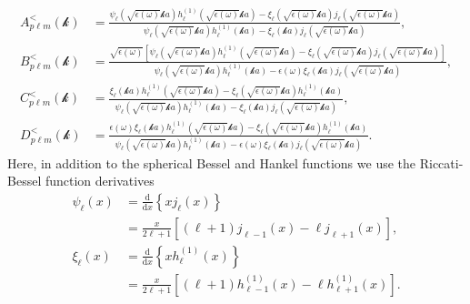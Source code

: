 \documentclass{article}
\begin{document}
\begin{equation}
\begin{split}
A_{p\ell m}^<(\mathcal{k}) &= \frac{\psi_\ell\left(\sqrt{\epsilon(\omega)}\mathcal{k}a\right)h_\ell^{(1)}\left(\sqrt{\epsilon(\omega)}\mathcal{k}a\right) - \xi_\ell\left(\sqrt{\epsilon(\omega)}\mathcal{k}a\right)j_\ell\left(\sqrt{\epsilon(\omega)}\mathcal{k}a\right)}{\psi_\ell\left(\sqrt{\epsilon(\omega)}\mathcal{k}a\right)h_\ell^{(1)}(\mathcal{k}a) - \xi_\ell(\mathcal{k}a)j_\ell\left(\sqrt{\epsilon(\omega)}\mathcal{k}a\right)},\\[1.0em]
B_{p\ell m}^<(\mathcal{k}) &= \frac{\sqrt{\epsilon(\omega)}\left[\psi_\ell\left(\sqrt{\epsilon(\omega)}\mathcal{k}a\right)h_\ell^{(1)}\left(\sqrt{\epsilon(\omega)}\mathcal{k}a\right) - \xi_\ell\left(\sqrt{\epsilon(\omega)}\mathcal{k}a\right)j_\ell\left(\sqrt{\epsilon(\omega)}\mathcal{k}a\right)\right]}{\psi_\ell\left(\sqrt{\epsilon(\omega)}\mathcal{k}a\right)h_\ell^{(1)}(\mathcal{k}a) - \epsilon(\omega)\xi_\ell(\mathcal{k}a)j_\ell\left(\sqrt{\epsilon(\omega)}\mathcal{k}a\right)},\\[1.0em]
C_{p\ell m}^<(\mathcal{k}) &= \frac{\xi_\ell(\mathcal{k}a)h_\ell^{(1)}\left(\sqrt{\epsilon(\omega)}\mathcal{k}a\right) - \xi_\ell\left(\sqrt{\epsilon(\omega)}\mathcal{k}a\right)h_\ell^{(1)}(\mathcal{k}a)}{\psi_\ell\left(\sqrt{\epsilon(\omega)}\mathcal{k}a\right)h_\ell^{(1)}(\mathcal{k}a) - \xi_\ell(\mathcal{k}a)j_\ell\left(\sqrt{\epsilon(\omega)}\mathcal{k}a\right)},\\[1.0em]
D_{p\ell m}^<(\mathcal{k}) &= \frac{\epsilon(\omega)\xi_\ell(\mathcal{k}a)h_\ell^{(1)}\left(\sqrt{\epsilon(\omega)}\mathcal{k}a\right) - \xi_\ell\left(\sqrt{\epsilon(\omega)}\mathcal{k}a\right)h_\ell^{(1)}(\mathcal{k}a)}{\psi_\ell\left(\sqrt{\epsilon(\omega)}\mathcal{k}a\right)h_\ell^{(1)}(\mathcal{k}a) - \epsilon(\omega)\xi_\ell(\mathcal{k}a)j_\ell\left(\sqrt{\epsilon(\omega)}\mathcal{k}a\right)}.
\end{split}
\end{equation}
Here, in addition to the spherical Bessel and Hankel functions we use the Riccati-Bessel function derivatives
\begin{equation}
\begin{split}
\psi_\ell(x) &= \frac{\mathrm{d}}{\mathrm{d}x}\left\{xj_\ell(x)\right\}\\
&= \frac{x}{2\ell + 1}\left[(\ell + 1)j_{\ell - 1}(x) - \ell j_{\ell + 1}(x)\right], \\[0.5em]
\xi_\ell(x) &= \frac{\mathrm{d}}{\mathrm{d}x}\left\{xh_\ell^{(1)}(x)\right\}\\
&= \frac{x}{2\ell + 1}\left[(\ell + 1)h_{\ell - 1}^{(1)}(x) - \ell h_{\ell + 1}^{(1)}(x)\right].
\end{split}
\end{equation}
\end{document}

